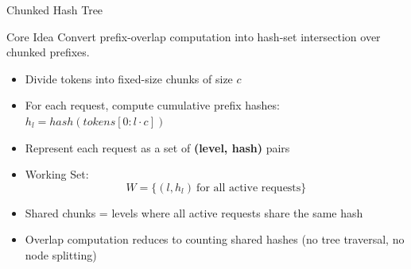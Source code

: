 \documentclass[Serif, 10pt, brown]{beamer}
\theoremstyle{example}
\theoremstyle{plain}
\begin{document}
\begin{frame}{Chunked Hash Tree}

\begin{block}{Core Idea}
Convert prefix-overlap computation into hash-set intersection over chunked prefixes.
\end{block}

\begin{itemize}
    \item Divide tokens into fixed-size chunks of size $c$
    
    \item For each request, compute cumulative prefix hashes: $h_l = hash(tokens[0 : l \cdot c])$
    
    \item Represent each request as a set of \textbf{(level, hash)} pairs
    
    \item Working Set:
    \[
        W = \{(l, h_l)\ \text{for all active requests}\}
    \]
    
    \item Shared chunks = levels where all active requests share the same hash
    
    \item Overlap computation reduces to counting shared hashes
    (no tree traversal, no node splitting)
\end{itemize}

\end{frame}
\end{document}
